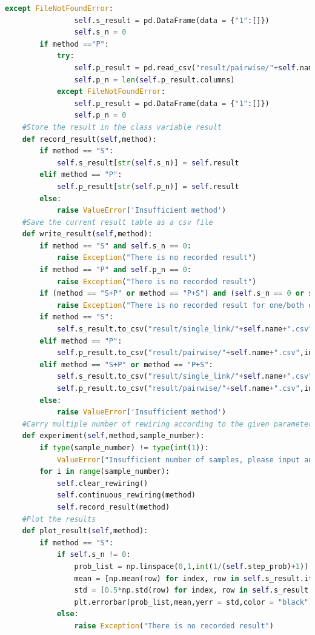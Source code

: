 \documentclass[12pt]{article}
\begin{document}
\begin{lstlisting}[breaklines=true,language=Python]
            except FileNotFoundError:
                self.s_result = pd.DataFrame(data = {"1":[]})
                self.s_n = 0
        if method =="P":
            try:
                self.p_result = pd.read_csv("result/pairwise/"+self.name+".csv")
                self.p_n = len(self.p_result.columns)
            except FileNotFoundError:
                self.p_result = pd.DataFrame(data = {"1":[]})
                self.p_n = 0
    #Store the result in the class variable result
    def record_result(self,method):
        if method == "S":
            self.s_result[str(self.s_n)] = self.result
        elif method == "P":
            self.p_result[str(self.p_n)] = self.result
        else:
            raise ValueError('Insufficient method')
    #Save the current result table as a csv file
    def write_result(self,method):
        if method == "S" and self.s_n == 0:
            raise Exception("There is no recorded result")
        if method == "P" and self.p_n == 0:
            raise Exception("There is no recorded result")
        if (method == "S+P" or method == "P+S") and (self.s_n == 0 or self.p_n==0):
            raise Exception("There is no recorded result for one/both of the methods.")
        if method == "S":
            self.s_result.to_csv("result/single_link/"+self.name+".csv",index = False)
        elif method == "P":
            self.p_result.to_csv("result/pairwise/"+self.name+".csv",index = False)
        elif method == "S+P" or method == "P+S":
            self.s_result.to_csv("result/single_link/"+self.name+".csv",index = False)
            self.p_result.to_csv("result/pairwise/"+self.name+".csv",index = False)
        else:
            raise ValueError('Insufficient method')
    #Carry multiple number of rewiring according to the given parameter
    def experiment(self,method,sample_number):
        if type(sample_number) != type(int(1)):
            ValueError("Insufficient number of samples, please input an integer.")        
        for i in range(sample_number):
            self.clear_rewiring()
            self.continuous_rewiring(method)            
            self.record_result(method)
    #Plot the results
    def plot_result(self,method):
        if method == "S":
            if self.s_n != 0:
                prob_list = np.linspace(0,1,int(1/(self.step_prob)+1))
                mean = [np.mean(row) for index, row in self.s_result.iterrows()]
                std = [0.5*np.std(row) for index, row in self.s_result.iterrows()]
                plt.errorbar(prob_list,mean,yerr = std,color = "black")
            else:
                raise Exception("There is no recorded result")

\end{lstlisting}
\end{document}
